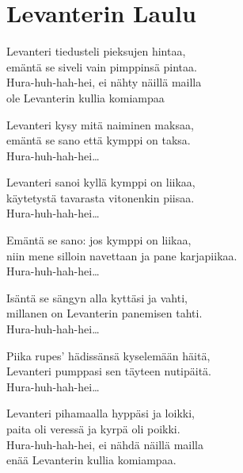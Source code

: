 \section{Levanterin Laulu}
Levanteri tiedusteli pieksujen hintaa,\\
emäntä se siveli vain pimppinsä pintaa.\\
Hura-huh-hah-hei, ei nähty näillä mailla\\
ole Levanterin kullia komiampaa

Levanteri kysy mitä naiminen maksaa,\\
emäntä se sano että kymppi on taksa.\\
Hura-huh-hah-hei…

Levanteri sanoi kyllä kymppi on liikaa,\\
käytetystä tavarasta vitonenkin piisaa.\\
Hura-huh-hah-hei…

Emäntä se sano: jos kymppi on liikaa,\\
niin mene silloin navettaan ja pane karjapiikaa.\\
Hura-huh-hah-hei…

Isäntä se sängyn alla kyttäsi ja vahti,\\
millanen on Levanterin panemisen tahti.\\
Hura-huh-hah-hei…

Piika rupes' hädissänsä kyselemään häitä,\\
Levanteri pumppasi sen täyteen nutipäitä.\\
Hura-huh-hah-hei…

Levanteri pihamaalla hyppäsi ja loikki,\\
paita oli veressä ja kyrpä oli poikki.\\
Hura-huh-hah-hei, ei nähdä näillä mailla\\
enää Levanterin kullia komiampaa.